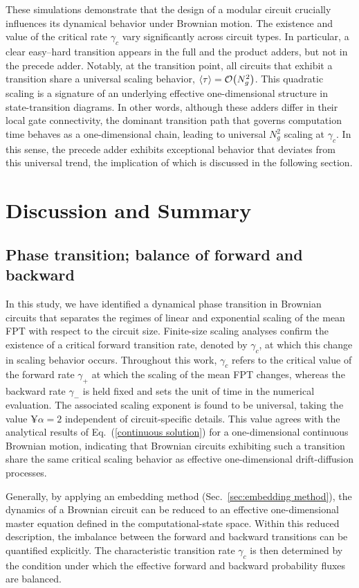 \documentclass[%
 reprint,
superscriptaddress,
 amsmath,amssymb,
 aps,
 prx,
]{revtex4-2}
\begin{document}
These simulations demonstrate that the design of a modular circuit crucially influences its dynamical behavior under Brownian motion. The existence and value of the critical rate $\gamma_c$ vary significantly across circuit types. In particular, a clear easy--hard transition appears in the full and the product adders, but not in the precede adder.
Notably, at the transition point, all circuits that exhibit a transition share a universal scaling behavior, $\expval{\tau} = \order{N_g^2}$. This quadratic scaling is a signature of an underlying effective one-dimensional structure in state-transition diagrams. In other words, although these adders differ in their local gate connectivity, the dominant transition path that governs computation time behaves as a one-dimensional chain, leading to universal $N_g^2$ scaling at $\gamma_c$. In this sense, the precede adder exhibits exceptional behavior that deviates from this universal trend, the implication of which is discussed in the following section. 


\section{Discussion and Summary}
\label{sec:discussion}
\subsection{Phase transition; balance of forward and backward}
In this study, we have identified a dynamical phase transition in Brownian circuits that separates the regimes of linear and exponential scaling of the mean FPT with respect to the circuit size. Finite-size scaling analyses confirm the existence of a critical forward transition rate, denoted by  $\gamma_c$, at which this change in scaling behavior occurs. Throughout this work, $\gamma_c$ refers to the critical value of the forward rate $\gamma_+$ at which the scaling of the mean FPT changes, whereas the backward rate $\gamma_-$ is held fixed and sets the unit of time in the numerical evaluation. The associated scaling exponent is found to be universal, taking the value ¥$\alpha=2$ independent of circuit-specific details. This value agrees with the analytical results of Eq.~(\ref{continuous solution}) for a one-dimensional continuous Brownian motion, indicating that Brownian circuits exhibiting such a transition share the same critical scaling behavior as effective one-dimensional drift-diffusion processes.  

Generally, by applying an embedding method (Sec.~\ref{sec:embedding method}), the dynamics of a Brownian circuit can be reduced to an effective one-dimensional master equation defined in the computational-state space. Within this reduced description, the imbalance between the forward and backward transitions can be quantified explicitly. The characteristic transition rate $\gamma_c$ is then determined by the condition under which the effective forward and backward probability fluxes are balanced.
\end{document}
